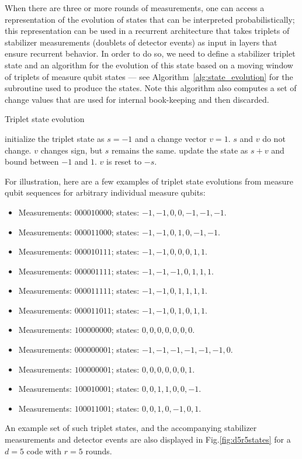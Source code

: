When there are three or more rounds of measurements, one can access a representation of the evolution of states that can be interpreted probabilistically; this representation can be used in a recurrent architecture that takes triplets of stabilizer measurements (doublets of detector events) as input in layers that ensure recurrent behavior. 
In order to do so, we need to define a stabilizer triplet state and an algorithm for the evolution of this state based on a moving window of triplets of measure qubit states --- see Algorithm~\ref{alg:state_evolution} for the subroutine used to produce the states. Note this algorithm also computes a set of change values that are used for internal book-keeping and then discarded.

\begin{algorithm}
\caption{Triplet state evolution}
\begin{algorithmic}[1]
      \State initialize the triplet state as $s=-1$ and a change vector $v=1$.
    \EndIf
      \State $s$ and $v$ do not change.
    \Else
        \State $v$ changes sign, but $s$ remains the same.
      \Else
        \State update the state as $s+v$ and bound between $-1$ and $1$.
      \EndIf
    \EndIf
      \State $v$ is reset to $-s$.
    \EndIf
  \EndFor
\EndFor
\end{algorithmic}
\label{alg:state_evolution}
\end{algorithm}

For illustration, here are a few examples of triplet state evolutions from measure qubit sequences for arbitrary individual measure qubits:
\begin{itemize}
\item Measurements: $000010000$; states: $-1,-1,0,0,-1,-1,-1$.
\item Measurements: $000011000$; states: $-1,-1,0,1,0,-1,-1$.
\item Measurements: $000010111$; states: $-1,-1,0,0,0,1,1$.
\item Measurements: $000001111$; states: $-1,-1,-1,0,1,1,1$.
\item Measurements: $000011111$; states: $-1,-1,0,1,1,1,1$.
\item Measurements: $000011011$; states: $-1,-1,0,1,0,1,1$.
\item Measurements: $100000000$; states: $0,0,0,0,0,0,0$.
\item Measurements: $000000001$; states: $-1,-1,-1,-1,-1,-1,0$.
\item Measurements: $100000001$; states: $0,0,0,0,0,0,1$.
\item Measurements: $100010001$; states: $0,0,1,1,0,0,-1$.
\item Measurements: $100011001$; states: $0,0,1,0,-1,0,1$.
\end{itemize}
An example set of such triplet states, and the accompanying stabilizer measurements and  detector events are also displayed in Fig.\ref{fig:d5r5states} for a $d=5$ code with $r=5$ rounds.

